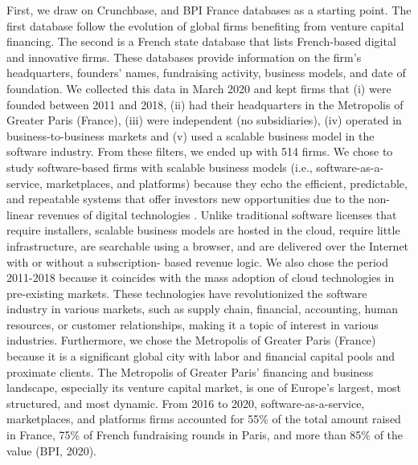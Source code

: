 \documentclass[12pt]{article}
\begin{document}
First, we draw on Crunchbase, and BPI France databases as a starting point. The first database follow the evolution of global firms benefiting from venture capital financing. The second is a French state database that lists French-based digital and innovative firms. These databases provide information on the firm’s headquarters, founders’ names, fundraising activity, business models, and date of foundation. We collected this data in March 2020 and kept firms that (i) were founded between 2011 and 2018, (ii) had their headquarters in the Metropolis of Greater Paris (France), (iii) were independent (no subsidiaries), (iv) operated in business-to-business markets and (v) used a scalable business model in the software industry. From these filters, we ended up with 514 firms. We chose to study software-based firms with scalable business models (i.e., software-as-a-service, marketplaces, and platforms) because they echo the efficient, predictable, and repeatable systems that offer investors new opportunities due to the non-linear revenues of digital technologies \citep{nambisan2017digital}. Unlike traditional software licenses that require installers, scalable business models are hosted in the cloud, require little infrastructure, are searchable using a browser, and are delivered over the Internet with or without a subscription- based revenue logic. We also chose the period 2011-2018 because it coincides with the mass adoption of cloud technologies in pre-existing markets. These technologies have revolutionized the software industry in various markets, such as supply chain, financial, accounting, human resources, or customer relationships, making it a topic of interest in various industries. Furthermore, we chose the Metropolis of Greater Paris (France) because it is a significant global city with labor and financial capital pools and proximate clients. The Metropolis of Greater Paris’ financing and business landscape, especially its venture capital market, is one of Europe’s largest, most structured, and most dynamic. From 2016 to 2020, software-as-a-service, marketplaces, and platforms firms accounted for 55\% of the total amount raised in France, 75\% of French fundraising rounds in Paris, and more than 85\% of the value (BPI, 2020).
\end{document}
